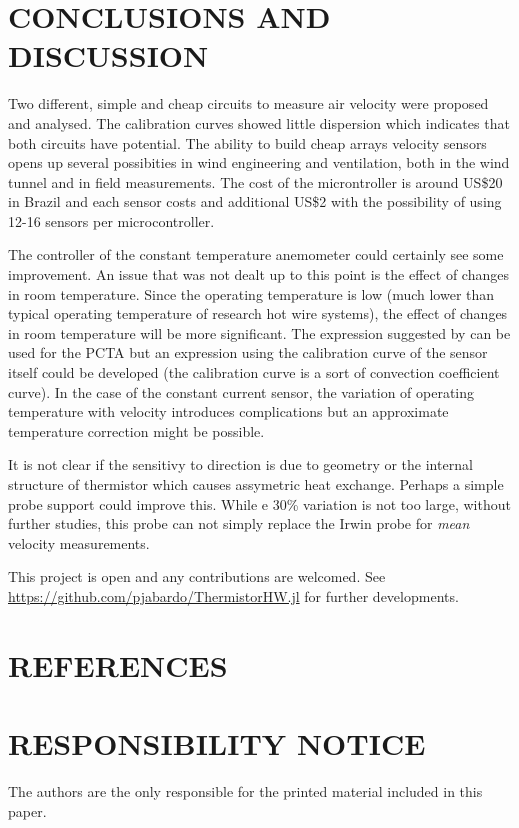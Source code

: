 \documentclass[10pt,fleqn,a4paper,twoside]{article}
\begin{document}
\section{CONCLUSIONS AND DISCUSSION}
Two different, simple and cheap circuits to measure air velocity were proposed and analysed. The calibration curves showed little dispersion which indicates that both circuits have potential. The ability to build cheap arrays velocity sensors opens up several possibities in wind engineering and ventilation, both in the wind tunnel and in field measurements. The cost of the microntroller is around US\$20 in Brazil and each sensor costs and additional US\$2 with the possibility of using 12-16 sensors per microcontroller.

The controller of the constant temperature anemometer could certainly see some improvement. An issue that was not dealt up to this point is the effect of changes in room temperature. Since the operating temperature is low (much lower than typical operating temperature of research hot wire systems), the effect of changes in room temperature will be more significant. The expression suggested by \citet{Jorgensen02} can be used for the PCTA but an expression using the calibration curve of the sensor itself could be developed (the calibration curve is a sort of convection coefficient curve). In the case of the constant current sensor, the variation of operating temperature with velocity introduces complications but an approximate temperature correction might be possible.

It is not clear if the sensitivy to direction is due to geometry or the internal structure of thermistor which causes assymetric heat exchange. Perhaps a simple probe support could improve this. While e 30\% variation is not too large, without further studies, this probe can not simply replace the Irwin probe \citep{Irwin81} for \emph{mean} velocity measurements.

This project is open and any contributions are welcomed. See \url{https://github.com/pjabardo/ThermistorHW.jl} for further developments.

\section{REFERENCES} 


\renewcommand{\refname}{}
%


\section{RESPONSIBILITY NOTICE}

The authors are the only responsible for the printed material included in this paper.
\end{document}
